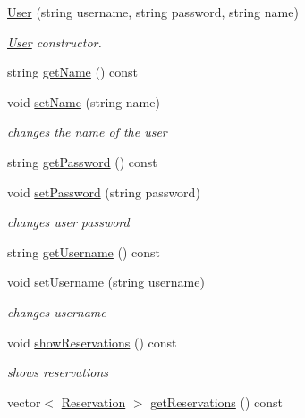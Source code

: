 \begin{DoxyCompactItemize}
\item 
\hyperlink{class_user_a97b74e31502b096fb30701b8eca44f15}{User} (string username, string password, string name)
\begin{DoxyCompactList}\small\item\em \hyperlink{class_user}{User} constructor. \end{DoxyCompactList}\item 
string \hyperlink{class_user_ab9b2b5feb6bdd1582696eb6d44cee384}{get\+Name} () const
\item 
void \hyperlink{class_user_acabf7e5a40909656de5bc631abe5588c}{set\+Name} (string name)
\begin{DoxyCompactList}\small\item\em changes the name of the user \end{DoxyCompactList}\item 
string \hyperlink{class_user_a33429bdd1253091697a9c5c5e1448bee}{get\+Password} () const
\item 
void \hyperlink{class_user_ab9645a2f4dc87343f9e9aeb408be41ad}{set\+Password} (string password)
\begin{DoxyCompactList}\small\item\em changes user password \end{DoxyCompactList}\item 
string \hyperlink{class_user_a82e034043e04b2d750c654c8b2f2ce78}{get\+Username} () const
\item 
void \hyperlink{class_user_a0fed77d10cd142ee4112d650ec564e6b}{set\+Username} (string username)
\begin{DoxyCompactList}\small\item\em changes username \end{DoxyCompactList}\item 
\hypertarget{class_user_a617552867a7590074ffe76afd9dd8740}{}\label{class_user_a617552867a7590074ffe76afd9dd8740} 
void \hyperlink{class_user_a617552867a7590074ffe76afd9dd8740}{show\+Reservations} () const
\begin{DoxyCompactList}\small\item\em shows reservations \end{DoxyCompactList}\item 
vector$<$ \hyperlink{class_reservation}{Reservation} $>$ \hyperlink{class_user_ab7b3c2424a2828feb264967c3c13d2cb}{get\+Reservations} () const
\item 
\hypertarget{class_user_a042d2deaef710af2fba05abd52367e48}{}\label{class_user_a042d2deaef710af2fba05abd52367e48} 

\end{DoxyCompactItemize}
